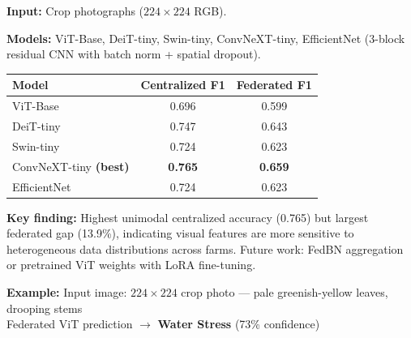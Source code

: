 \documentclass[11pt,a4paper]{article}
\begin{document}
\begin{paradigmbox}[linecolor=vitgreen]
\noindent{\large\bfseries\textcolor{vitgreen}{Paradigm 2 --- Federated ViT}}
\smallskip

\noindent\textbf{Input:} Crop photographs ($224{\times}224$ RGB).

\noindent\textbf{Models:} ViT-Base, DeiT-tiny, Swin-tiny, ConvNeXT-tiny, EfficientNet
(3-block residual CNN with batch norm + spatial dropout).

\smallskip
\begin{center}
\renewcommand{\arraystretch}{1.3}
\begin{tabular}{lcc}
\toprule
\textbf{Model} & \textbf{Centralized F1} & \textbf{Federated F1} \\
\midrule
ViT-Base       & 0.696 & 0.599 \\
DeiT-tiny      & 0.747 & 0.643 \\
Swin-tiny      & 0.724 & 0.623 \\
\rowcolor{vitlight}
ConvNeXT-tiny \textbf{(best)} & \textbf{0.765} & \textbf{0.659} \\
EfficientNet   & 0.724 & 0.623 \\
\bottomrule
\end{tabular}
\end{center}

\noindent\textbf{Key finding:} Highest unimodal centralized accuracy (0.765) but largest
federated gap (13.9\%), indicating visual features are more sensitive to heterogeneous
data distributions across farms.
Future work: FedBN aggregation or pretrained ViT weights with LoRA fine-tuning.

\begin{examplebox}
\textbf{Example:}\enspace
Input image: $224{\times}224$ crop photo --- pale greenish-yellow leaves, drooping stems \\
Federated ViT prediction $\to$ \textbf{Water Stress} \hfill (73\% confidence)
\end{examplebox}
\end{paradigmbox}
\end{document}
